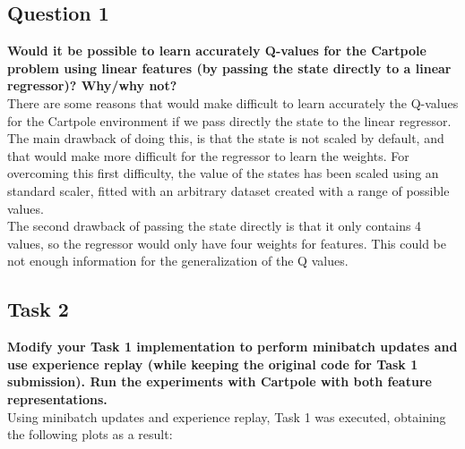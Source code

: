 \documentclass[12pt]{article}
\begin{document}
\subsection{Question 1}
\textbf{
Would it be possible to learn accurately Q-values for the Cartpole problem using linear features (by passing the state directly to a linear regressor)? Why/why not?
}\\

There are some reasons that would make difficult to learn accurately the Q-values for the Cartpole environment if we pass directly the state to the linear regressor. \\

The main drawback of doing this, is that the state is not scaled by default, and that would make more difficult for the regressor to learn the weights. For overcoming this first difficulty, the value of the states has been scaled using an standard scaler, fitted with an arbitrary dataset created with a range of possible values. \\

The second drawback of passing the state directly is that it only contains 4 values, so the regressor would only have four weights for features. This could be not enough information for the generalization of the Q values.

\subsection{Task 2}
\textbf{Modify your Task 1 implementation to perform minibatch updates and use experience replay (while keeping the original code for Task 1 submission). Run the experiments with Cartpole with both feature representations.}\\

Using minibatch updates and experience replay, Task 1 was executed, obtaining the following plots as a result:
\end{document}
